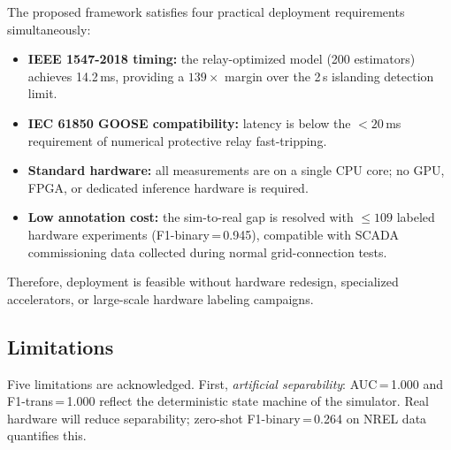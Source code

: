 \documentclass[journal]{IEEEtran}
\begin{document}
The proposed framework satisfies four practical deployment requirements
simultaneously:
\begin{itemize}
\item \textbf{IEEE 1547-2018 timing:} the relay-optimized model (200 estimators)
  achieves 14.2\,ms, providing a $139\times$ margin over the
  2\,s islanding detection limit.
\item \textbf{IEC 61850 GOOSE compatibility:} latency is below the
  $<20$\,ms requirement of numerical protective relay fast-tripping.
\item \textbf{Standard hardware:} all measurements are on a single CPU core;
  no GPU, FPGA, or dedicated inference hardware is required.
\item \textbf{Low annotation cost:} the sim-to-real gap is resolved with
  $\leq 109$ labeled hardware experiments
  (F1-binary\,=\,0.945), compatible with SCADA commissioning data
  collected during normal grid-connection tests.
\end{itemize}
Therefore, deployment is feasible without hardware redesign,
specialized accelerators, or large-scale hardware labeling campaigns.

\subsection{Limitations}

Five limitations are acknowledged.
First, \emph{artificial separability}: AUC\,=\,1.000 and
F1-trans\,=\,1.000 reflect the deterministic state machine of the
simulator. Real hardware will reduce separability; zero-shot
F1-binary\,=\,0.264 on NREL data quantifies this.
\end{document}
